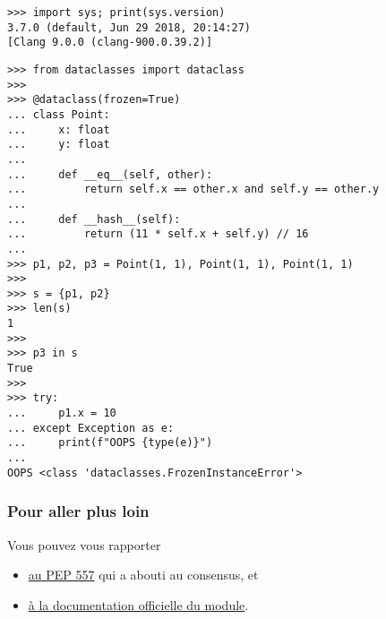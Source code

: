     \begin{verbatim}
>>> import sys; print(sys.version)
3.7.0 (default, Jun 29 2018, 20:14:27)
[Clang 9.0.0 (clang-900.0.39.2)]
\end{verbatim}

    \begin{verbatim}
>>> from dataclasses import dataclass
>>>
>>> @dataclass(frozen=True)
... class Point:
...     x: float
...     y: float
...
...     def __eq__(self, other):
...         return self.x == other.x and self.y == other.y
...
...     def __hash__(self):
...         return (11 * self.x + self.y) // 16
...
>>> p1, p2, p3 = Point(1, 1), Point(1, 1), Point(1, 1)
>>>
>>> s = {p1, p2}
>>> len(s)
1
>>>
>>> p3 in s
True
>>>
>>> try:
...     p1.x = 10
... except Exception as e:
...     print(f"OOPS {type(e)}")
...
OOPS <class 'dataclasses.FrozenInstanceError'>
\end{verbatim}

    \hypertarget{pour-aller-plus-loin}{%
\subsubsection{Pour aller plus loin}\label{pour-aller-plus-loin}}

    Vous pouvez vous rapporter

\begin{itemize}
\tightlist
\item
  \href{https://www.python.org/dev/peps/pep-0557/}{au PEP 557} qui a
  abouti au consensus, et
\item
  \href{https://docs.python.org/3/library/dataclasses.html}{à la
  documentation officielle du module}.
\end{itemize}


    
    
    
